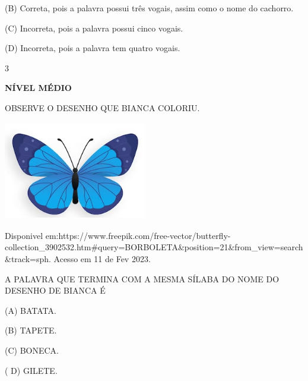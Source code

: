 \begin{escola}
{{{{{{{{{{{{{{{{{(B) Correta, pois a palavra possui três vogais, assim como o nome do
cachorro.

(C) Incorreta, pois a palavra possui cinco vogais.

(D) Incorreta, pois a palavra tem quatro vogais.

\num{3}

\textbf{NÍVEL MÉDIO}

OBSERVE O DESENHO QUE BIANCA COLORIU.

\includegraphics[width=2.45833in,height=1.69432in]{media/image227.png}

Disponivel
em:https://www.freepik.com/free-vector/butterfly-collection\_3902532.htm\#query=BORBOLETA\&position=21\&from\_view=search\&track=sph.
Acesso em 11 de Fev 2023.

A PALAVRA QUE TERMINA COM A MESMA SÍLABA DO NOME DO DESENHO DE BIANCA É

\begin{escolha}
\item(A) BATATA.

\item(B) TAPETE.

\item(C) BONECA.

\item( D) GILETE.
\end{escolha}

}}}}}}}}}}}}}}}}}
\end{escola}
